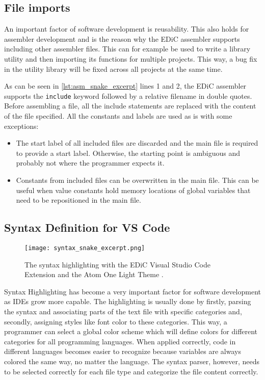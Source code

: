 \subsection{File imports}\label{sec:imports}
An important factor of software development is reusability.
This also holds for assembler development and is the reason why the \gls{EDiC} assembler supports including other assembler files.
This can for example be used to write a library utility and then importing its functions for multiple projects.
This way, a bug fix in the utility library will be fixed across all projects at the same time.

As can be seen in \cref{lst:asm_snake_excerpt} lines 1 and 2, the \gls{EDiC} assembler supports the \texttt{include} keyword followed by a relative filename in double quotes.
Before assembling a file, all the include statements are replaced with the content of the file specified.
All the constants and labels are used as is with some exceptions:
\begin{itemize}
  \item The start label of all included files are discarded and the main file is required to provide a start label.
  Otherwise, the starting point is ambiguous and probably not where the programmer expects it.
  \item Constants from included files can be overwritten in the main file.
  This can be useful when value constants hold memory locations of global variables that need to be repositioned in the main file.
\end{itemize}


\subsection{Syntax Definition for VS Code}
\begin{figure}[t]
  \centering
  \texttt{[image: syntax\_snake\_excerpt.png]}
  \caption{The syntax highlighting with the \gls{EDiC} Visual Studio Code Extension and the Atom One Light Theme \cite{VSCodeLight}.}
  \label{fig:SyntaxEDiC}
\end{figure}
Syntax Highlighting has become a very important factor for software development as \glspl{IDE} grow more capable.
The highlighting is usually done by firstly, parsing the syntax and associating parts of the text file with specific categories and, secondly, assigning styles like font color to these categories.
This way, a programmer can select a global color scheme which will define colors for different categories for all programming languages.
When applied correctly, code in different languages becomes easier to recognize because variables are always colored the same way, no matter the language.
The syntax parser, however, needs to be selected correctly for each file type and categorize the file content correctly.


